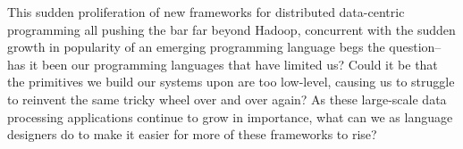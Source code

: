 \documentclass[10pt]{sigplanconf}
\theoremstyle{definition}
\theoremstyle{definition}
\newcommand{\fixme}[1]{{\color{gray}\itshape#1}}
\begin{document}




%
%
%
%


This sudden proliferation of new frameworks for distributed data-centric
programming all pushing the bar far beyond Hadoop, concurrent with the sudden
growth in popularity of an emerging programming language begs the question--has
it been our programming languages that have limited us? Could it be that the
primitives we build our systems upon are too low-level, causing us to struggle
to reinvent the same tricky wheel over and over again? As these large-scale data
processing applications continue to grow in importance, what can we as language
designers do to make it easier for more of these frameworks to rise?
\end{document}

